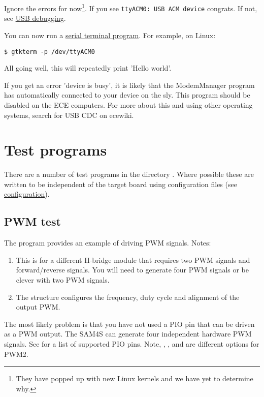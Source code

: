 Ignore the errors for now\footnote{They have popped up with new Linux
  kernels and we have yet to determine why.}. If you see
\texttt{ttyACM0:\ USB\ ACM\ device} congrats. If not, see
\href{USB_debugging}{USB debugging}.

You can now run a \href{Serial_terminal_applications}{serial terminal
program}. For example, on Linux:

\begin{verbatim}
$ gtkterm -p /dev/ttyACM0
\end{verbatim}

All going well, this will repeatedly print 'Hello world'.

If you get an error 'device is busy', it is likely that the ModemManager
program has automatically connected to your device on the sly. This
program should be disabled on the ECE computers. For more about this and
using other operating systems, search for USB CDC on ecewiki.

\section{Test programs}
\label{test-programs}

There are a number of test programs in the directory
. Where possible these are written to be
independent of the target board using configuration files (see
\protect\hyperref[configuration]{configuration}).

\subsection{PWM test}
\label{pwm-test}

The program
\href{https://eng-git.canterbury.ac.nz/mph/wacky-racers-2021/blob/master/src/test-apps/pwm_test2/pwm_test2.c}{}
provides an example of driving PWM signals. Notes:
%
\begin{enumerate}
\item
  This is for a different H-bridge module that requires two PWM signals
  and forward/reverse signals. You will need to generate four PWM
  signals or be clever with two PWM signals.
\item
  The  structure configures the frequency, duty
  cycle and alignment of the output PWM.
\end{enumerate}

The most likely problem is that you have not used a PIO pin that can be
driven as a PWM output. The SAM4S can generate four independent hardware
PWM signals. See
\href{https://eng-git.canterbury.ac.nz/mph/wacky-racers-2021/blob/master/src/mat91lib/pwm/pwm.c}{}
for a list of supported PIO pins. Note, , , and  are
different options for PWM2.

